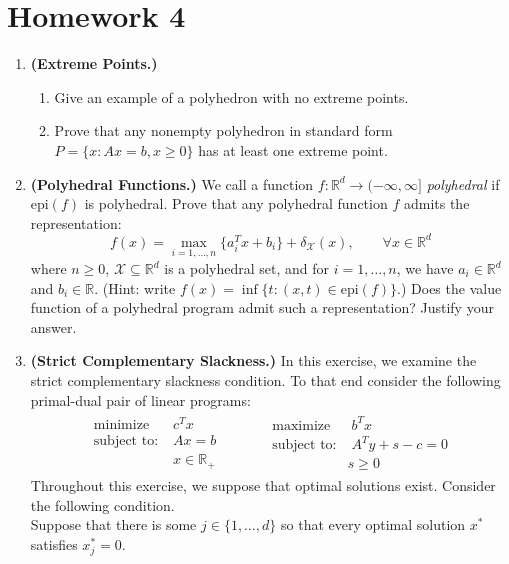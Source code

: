 \documentclass[12pt]{article}
\numberwithin{equation}{section}
\newcommand{\RR}{\mathbb{R}}
\newcommand{\st}{\text{subject to:}}
\newcommand{\minimize}{\mathrm{minimize}}
\newcommand{\maximize}{\mathrm{maximize}}
\newcommand{\cX}{\mathcal{X}}
\newcommand{\epi}{\mathrm{epi}}
\theoremstyle{remark}
\begin{document}
\newpage

\section{Homework 4}

\begin{enumerate}
\item {\bf (Extreme Points.)}
\begin{enumerate}
\item Give an example of a polyhedron with no extreme points. 
\item Prove that any nonempty polyhedron in standard form $P = \{x \colon Ax = b, x \geq 0\}$ has at least one extreme point.
\end{enumerate} 
\item {\bf (Polyhedral Functions.)}
We call a function $f : \RR^d \rightarrow (-\infty, \infty]$ \emph{polyhedral} if $\epi(f)$ is polyhedral. Prove that any polyhedral function $f$ admits the representation:
$$
f(x) = \max_{i = 1, \ldots, n} \{a_i^T x + b_i\} + \delta_{\cX}(x), \qquad \forall x \in \RR^d 
$$
where $n \geq 0$, $\cX \subseteq \RR^d$ is a polyhedral set, and for $i = 1, \ldots, n$, we have $a_i \in \RR^d$ and $b_i \in \RR$. (Hint: write $f(x) = \inf\{ t \colon (x, t) \in \epi(f)\}$.) Does the value function of a polyhedral program admit such a representation? Justify your answer.
\item {\bf (Strict Complementary Slackness.)} In this exercise, we examine the strict complementary slackness condition. To that end consider the following primal-dual pair of linear programs:  
 \begin{align}
\begin{aligned}
\minimize &\; c^T x \\
\st & \; Ax = b  \\
& \; x \in \RR_+ 
\end{aligned}&& && 
\begin{aligned}
\maximize &\; b^T x \\
\st & \; A^Ty + s - c = 0  \\
&  s \geq 0
\end{aligned}
\end{align}
Throughout this exercise, we suppose that optimal solutions exist. Consider the following condition.
~\\

 Suppose that there is some $j \in \{1, \ldots, d\}$ so that every optimal solution $x^\ast$ satisfies $x_j^\ast = 0$. 
~\\


\end{enumerate}
\end{document}
